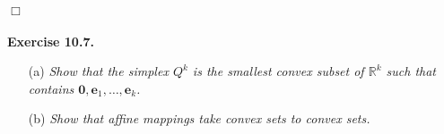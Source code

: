 \documentclass{article}
\begin{document}
$\Box$ \\\\






\textbf{Exercise 10.7.}
\begin{enumerate}
\item[(a)]
  \emph{Show that the simplex $Q^k$ is the smallest convex subset of $\mathbb{R}^k$
  such that contains $\mathbf{0}, \mathbf{e}_1, \ldots, \mathbf{e}_k$.}

\item[(b)]
  \emph{Show that affine mappings take convex sets to convex sets.} \\
\end{enumerate}
\end{document}

